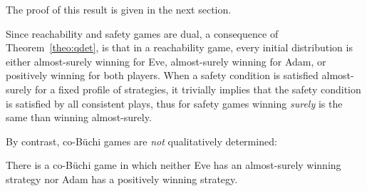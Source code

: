 The proof of this result is given in the next section.

Since reachability and safety games are dual, a consequence of
Theorem~\ref{theo:qdet}, is that in a reachability game, every initial
distribution is either almost-surely winning for Eve,
almost-surely winning for Adam, or positively
winning for both players.
When a safety condition is satisfied almost-surely for a fixed profile of strategies,
it trivially implies that the safety condition is
satisfied by all consistent plays,
thus for safety games winning \emph{surely} is the same than winning almost-surely.



By contrast, co-B{\"u}chi games are \emph{not} qualitatively determined:
\begin{lemma}
There is a co-B{\"u}chi game in which neither Eve has an almost-surely winning strategy
nor Adam has a positively winning strategy.
\end{lemma}
